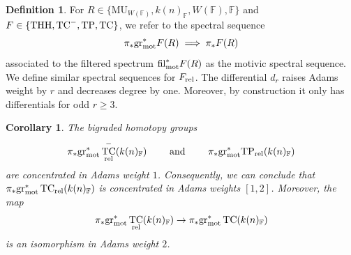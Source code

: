\documentclass[english,10pt]{amsart}
\newcommand{\rel}{\textup{rel}}
\newcommand{\field}{\mathbb{F}}
\newtheorem{cor}{Corollary}[section]
\theoremstyle{definition}
\newtheorem{defi}{Definition}[section]
\numberwithin{equation}{section}
\newcommand{\mot}{\textup{mot}}
\DeclareMathOperator{\TC}{TC}
\DeclareMathOperator{\thh}{\ensuremath{\textup{THH}}}
\newcommand{\THH}{\thh}
\newcommand{\fil}{\mathrm{fil}}
\newcommand{\TP}{\mathrm{TP}}
\newcommand{\grmot}{\mathrm{gr}_{\textup{mot}}^*}
\begin{document}
\begin{defi}\label{defi motivic spectral sequence}
For $R\in \{\mathrm{MU}_{W(\field)},k(n)_{\field},W(\field),\field\}$ and $F\in \{\THH,\TC^{-},\TP,\TC\}$, we refer to the spectral sequence 
\[ \pi_*\grmot F(R)\implies \pi_*F(R)
\]
associated to the filtered spectrum  $\fil_{\mot}^* F(R)$ as the motivic spectral sequence. We define similar spectral sequences for $F_{\textup{rel}}$. The differential $d_r$ raises Adams weight by $r$ and decreases degree by one.  Moreover, by construction it only has differentials for odd $r \geq 3$. 
\end{defi}

\begin{cor}\label{Adams weights}
The bigraded homotopy groups 
\[ 
\pi_*\grmot\TC^{-}_{\rel}(k(n)_{\field}) \qquad \text{ and } \qquad \pi_*\grmot\TP_{\rel}(k(n)_{\field})
\]
are concentrated in Adams weight $1$. Consequently, we can conclude that $\pi_*\grmot\TC_{\rel}(k(n)_{\field})$ is concentrated in Adams weights $[1,2]$. Moreover, the map 
\[\pi_*\grmot\TC_{\rel}(k(n)_{\field})\to \pi_*\grmot\TC(k(n)_{\field}) \]
is an isomorphism in Adams weight $2$. 
\end{cor}
\end{document}
